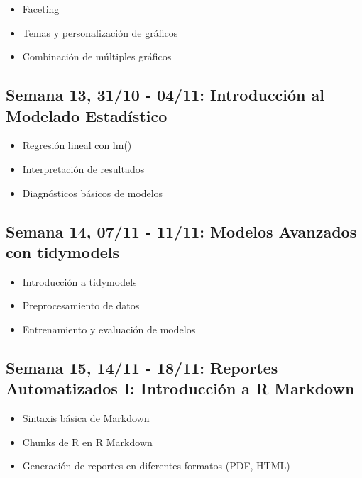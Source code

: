 \documentclass[11pt,letter,]{article}
\providecommand{\tightlist}{%
  \setlength{\itemsep}{0pt}\setlength{\parskip}{0pt}}
\begin{document}
\begin{itemize}
\tightlist
\item
  Faceting
\item
  Temas y personalización de gráficos
\item
  Combinación de múltiples gráficos
\end{itemize}

\hypertarget{semana-13-3110---0411-introducciuxf3n-al-modelado-estaduxedstico}{%
\subsection{Semana 13, 31/10 - 04/11: Introducción al Modelado
Estadístico}\label{semana-13-3110---0411-introducciuxf3n-al-modelado-estaduxedstico}}

\begin{itemize}
\tightlist
\item
  Regresión lineal con lm()
\item
  Interpretación de resultados
\item
  Diagnósticos básicos de modelos
\end{itemize}

\hypertarget{semana-14-0711---1111-modelos-avanzados-con-tidymodels}{%
\subsection{Semana 14, 07/11 - 11/11: Modelos Avanzados con
tidymodels}\label{semana-14-0711---1111-modelos-avanzados-con-tidymodels}}

\begin{itemize}
\tightlist
\item
  Introducción a tidymodels
\item
  Preprocesamiento de datos
\item
  Entrenamiento y evaluación de modelos
\end{itemize}

\hypertarget{semana-15-1411---1811-reportes-automatizados-i-introducciuxf3n-a-r-markdown}{%
\subsection{Semana 15, 14/11 - 18/11: Reportes Automatizados I:
Introducción a R
Markdown}\label{semana-15-1411---1811-reportes-automatizados-i-introducciuxf3n-a-r-markdown}}

\begin{itemize}
\tightlist
\item
  Sintaxis básica de Markdown
\item
  Chunks de R en R Markdown
\item
  Generación de reportes en diferentes formatos (PDF, HTML)
\end{itemize}
\end{document}
